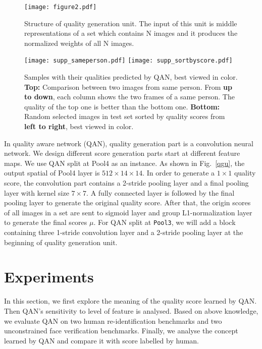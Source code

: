 \documentclass[10pt,twocolumn,letterpaper]{article}
\begin{document}
\begin{figure}[!htbp]
  \centering
  \texttt{[image: figure2.pdf]}
  \caption{Structure of quality generation unit. The input of this unit is middle representations of a set which contains N images and it produces the normalized weights of all N images.}
  \label{qgu}
\label{figure2}
\end{figure}



\begin{figure*}[!ht]
  \centering
  \texttt{[image: supp\_sameperson.pdf]}
  \texttt{[image: supp\_sortbyscore.pdf]}
  \caption{Samples with their qualities predicted by QAN, best viewed in color. \textbf{Top:} Comparison between two images from same person. From \textbf{up to down}, each column shows the two frames of a same person. The quality of the top one is better than the bottom one. \textbf{Bottom:} Random selected images in test set sorted by quality scores from \textbf{left to right}, best viewed in color.}
  \label{fig:samples}
\end{figure*}

In quality aware network (QAN), quality generation part is a  convolution neural network. We design different score generation parts start at different feature maps. We use QAN split at Pool4 as an instance. As shown in Fig.~\ref{qgu}, the output spatial of Pool4 layer is $512\times14\times14$. In order to generate a $1\times1$ quality score, the convolution part contains a 2-stride pooling layer and a final pooling layer with kernel size $7\times7$. A fully connected layer is followed by the final pooling layer to generate the original quality score. After that, the origin scores of all images in a set are sent to sigmoid layer and group L1-normalization layer to generate the final scores $\mu$. For QAN split at \texttt{Pool3}, we will add a block containing three 1-stride convolution layer and a 2-stride pooling layer at the beginning of quality generation unit. 

\section{Experiments}
\label{others}
In this section, we first explore the meaning of the quality score learned by QAN. Then QAN's sensitivity to level of feature is analysed. Based on above knowledge, we evaluate QAN on two human re-identification benchmarks and two unconstrained face verification benchmarks. Finally, we analyse the concept learned by QAN and compare it with score labelled by human.
\end{document}
